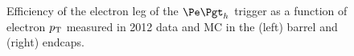\begin{figure}[htb]
\caption[Efficiency of the electron leg of the $\etau$ trigger as a function of electron $\pt$ measured
in 2012 data and MC.]{Efficiency of the electron leg of the $\etau$ trigger as a function of electron $\pt$ measured
in 2012 data and MC in the (left) barrel and (right) endcaps.}
\label{fig:electrontrg}
\end{figure}

